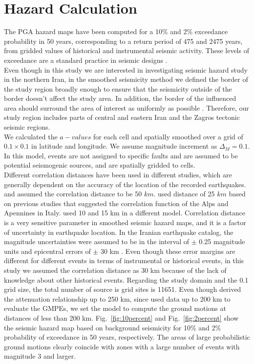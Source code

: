 \section{Hazard Calculation}

The PGA hazard maps have been computed for a 10\% and 2\% exceedance probability in 50 years, corresponding to a return period of 475 and 2475 years, from gridded values of historical and instrumental seismic activity. These levels of exceedance are a standard practice in seismic designs \citep{BHRC2014}.\\
\noindent
Even though in this study we are interested in investigating seismic hazard study in the northern Iran, in the smoothed seismicity method we defined the border of the study region broadly enough to ensure that the seismicity outside of the border doesn't affect the study area.  In addition, the border of the influenced area should surround the area of interest as uniformly as possible \citep{Lapajne1997}. Therefore, our study region includes parts of central and eastern Iran and the Zagros tectonic seismic regions.\\
\noindent
We calculated the $a-values$ for each cell and spatially smoothed over a grid of $0.1 \times 0.1$ in latitude and longitude. We assume magnitude increment as $\Delta_M = 0.1$. In this model, events are not assigned to specific faults and are assumed to be potential seismogenic sources, and are spatially gridded to cells. \\
\noindent
Different correlation distances have been used in different studies, which are generally dependent on the accuracy of the location of the recorded earthquakes. \citet{Frankel1995} and \citet{Boyd2008} assumed the correlation distance to be 50 $km$. \citet{Barani2007} used distance of 25 $km$ based on previous studies that suggested the correlation function of the Alps and Apennines in Italy. \citet{Foteva2006} used 10 and 15 km in a different model. Correlation distance is a very sensitive parameter in smoothed seismic hazard maps, and it is a factor of uncertainty in earthquake location. In the Iranian earthquake catalog, the magnitude uncertainties were assumed to be in the interval of $\pm$ 0.25 magnitude units and epicentral errors of $\pm$ 30 km \citep{Zare2012}. Even though these error margins are different for different events in terms of instrumental or historical events, in this study we assumed the correlation distance as 30 km because of the lack of knowledge about other historical events. Regarding the study domain and the 0.1 grid size, the total number of source is grid sites is 11651. Even though \citet{Kalkan2004} derived the attenuation relationship up to 250 km, since \citet{Zafarani2014} used data up to 200 km to evaluate the GMPEs, we set the model to compute the ground motions at distances of less than 200 km.
Fig.~\ref{fig:10percent} and Fig.~\ref{fig:2percent} show the seismic hazard map based on background seismicity for 10\% and 2\% probability of exceedance in 50 years, respectively. The areas of large probabilistic ground motions clearly coincide with zones with a large number of events with magnitude 3 and larger.


